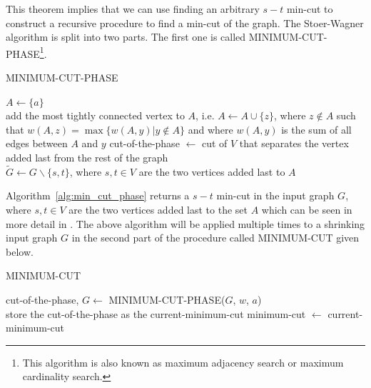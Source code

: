 \documentclass[paper=a4,fontsize=11pt,DIV=8,BCOR=5mm,twoside,pdftex,bibtotocnumbered]{scrreprt}
\theoremstyle{plain}
\begin{document}
This theorem implies that we can use finding an arbitrary $s-t$ min-cut to construct a recursive procedure to find a min-cut of the graph. The Stoer-Wagner algorithm is split into two parts. The first one is called MINIMUM-CUT-PHASE\footnote{This algorithm is also known as maximum adjacency search or maximum cardinality search.}.

\begin{algorithm}
	\caption{MINIMUM-CUT-PHASE}\label{alg:min_cut_phase}
	$A \gets \{a\}$\\
		{add the most tightly connected vertex to $A$, i.e. $A \gets A \cup \{z\}$, where $z \notin A$ such that $w(A, z) = \max \{w(A,y) | y \notin A\}$ and where $w(A,y)$ is the sum of all edges between $A$ and $y$}
	cut-of-the-phase $\gets$ cut of $V$ that separates the vertex added last from the rest of the graph\\
	$\tilde{G} \gets G\backslash\{s,t\}$, where $s,t \in V$ are the two vertices added last to $A$
\end{algorithm}

Algorithm~\ref{alg:min_cut_phase} returns a $s-t$ min-cut in the input graph $G$, where $s, t \in V$ are the two vertices added last to the set $A$ which can be seen in more detail in \cite[Lemma~3.1]{Stoer1997}. The above algorithm will be applied multiple times to a shrinking input graph $G$ in the second part of the procedure called MINIMUM-CUT given below.

\begin{algorithm}
	\caption{MINIMUM-CUT}\label{alg:min_cut}
	{cut-of-the-phase, $G \gets$ MINIMUM-CUT-PHASE($G$, $w$, $a$)\\
	{store the cut-of-the-phase as the current-minimum-cut}}
	minimum-cut $\gets$ current-minimum-cut
\end{algorithm}
\end{document}
